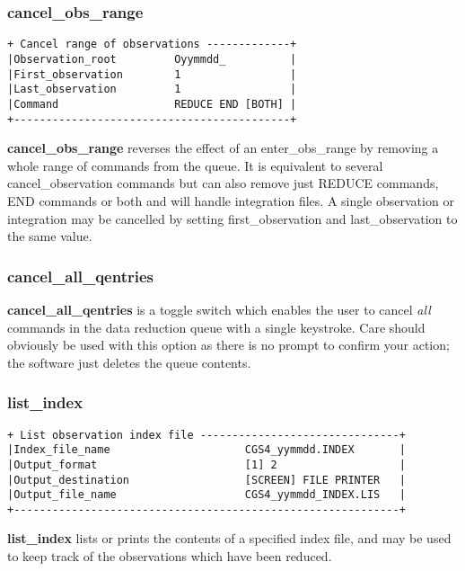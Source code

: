 {\subsubsection{cancel\_obs\_range}
\label{cancel_obs_range}
\begin{verbatim}
+ Cancel range of observations -------------+
|Observation_root         Oyymmdd_          |
|First_observation        1                 |
|Last_observation         1                 |
|Command                  REDUCE END [BOTH] |
+-------------------------------------------+
\end{verbatim}

{\bf cancel\_obs\_range} reverses the effect of an 
{\sf enter\_obs\_range} by removing a whole range of commands from the 
queue. It is equivalent to several {\sf cancel\_observation} commands
but can also remove just {\sf REDUCE} commands, {\sf END} commands or
both and will handle integration files. A single observation or integration
may be cancelled by setting {\sf first\_observation} and {\sf last\_observation}
to the same value.

\subsubsection{cancel\_all\_qentries}
\label{cancel_all_qentries}

{\bf cancel\_all\_qentries} is a toggle switch which enables the user to
cancel {\em all} commands in the data reduction queue with a single
keystroke. Care should obviously be used with this option as there is no 
prompt to confirm your action; the software just deletes the queue contents.

\subsubsection{list\_index}
\label{list_index}
\begin{verbatim}
+ List observation index file -------------------------------+
|Index_file_name                     CGS4_yymmdd.INDEX       |
|Output_format                       [1] 2                   |
|Output_destination                  [SCREEN] FILE PRINTER   |
|Output_file_name                    CGS4_yymmdd_INDEX.LIS   |
+------------------------------------------------------------+
\end{verbatim}

{\bf list\_index} lists or prints the contents of a specified index 
file, and may be used to keep track of the observations which have been 
reduced.

}
